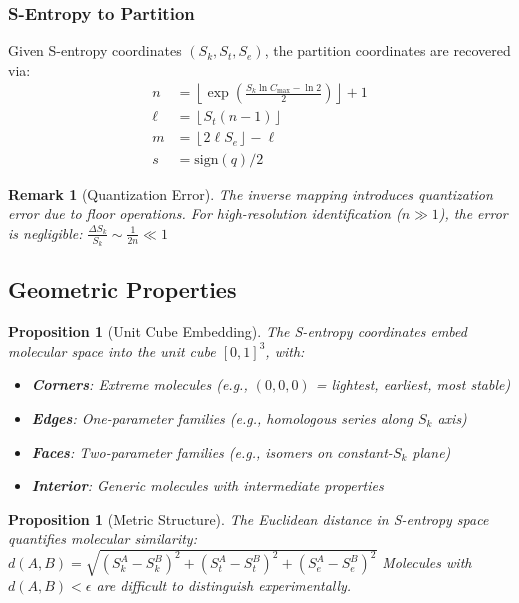 \documentclass[twocolumn,10pt]{article}
\newtheorem{proposition}[theorem]{Proposition}
\newtheorem{remark}[theorem]{Remark}
\begin{document}
\subsubsection{S-Entropy to Partition}

Given S-entropy coordinates $(S_k, S_t, S_e)$, the partition coordinates are recovered via:
\begin{align}
n &= \left\lfloor \exp\left(\frac{S_k \ln C_{\max} - \ln 2}{2}\right) \right\rfloor + 1 \\
\ell &= \left\lfloor S_t (n-1) \right\rfloor \\
m &= \left\lfloor 2\ell S_e \right\rfloor - \ell \\
s &= \text{sign}(q)/2
\end{align}

\begin{remark}[Quantization Error]
The inverse mapping introduces quantization error due to floor operations. For high-resolution identification ($n \gg 1$), the error is negligible:
$
\frac{\Delta S_k}{S_k} \sim \frac{1}{2n} \ll 1
$
\end{remark}

\subsection{Geometric Properties}

\begin{proposition}[Unit Cube Embedding]
\label{prop:unitcube}
The S-entropy coordinates embed molecular space into the unit cube $[0,1]^3$, with:
\begin{itemize}
    \item \textbf{Corners}: Extreme molecules (e.g., $(0,0,0)$ = lightest, earliest, most stable)
    \item \textbf{Edges}: One-parameter families (e.g., homologous series along $S_k$ axis)
    \item \textbf{Faces}: Two-parameter families (e.g., isomers on constant-$S_k$ plane)
    \item \textbf{Interior}: Generic molecules with intermediate properties
\end{itemize}
\end{proposition}

\begin{proposition}[Metric Structure]
\label{prop:metric}
The Euclidean distance in S-entropy space quantifies molecular similarity:
$
d(A, B) = \sqrt{(S_k^A - S_k^B)^2 + (S_t^A - S_t^B)^2 + (S_e^A - S_e^B)^2}
$
Molecules with $d(A, B) < \epsilon$ are difficult to distinguish experimentally.
\end{proposition}
\end{document}
